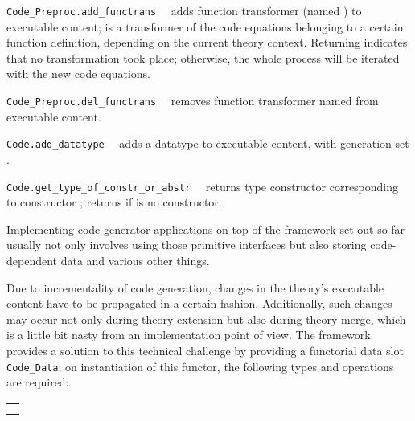\begin{isabellebody}
\begin{isamarkuptext}
\begin{description}
  \item \verb|Code_Preproc.add_functrans|~~ adds
     function transformer  (named ) to executable content;
      is a transformer of the code equations belonging
     to a certain function definition, depending on the
     current theory context.  Returning  indicates that no
     transformation took place;  otherwise, the whole process will be iterated
     with the new code equations.

  \item \verb|Code_Preproc.del_functrans|~~ removes
     function transformer named  from executable content.

  \item \verb|Code.add_datatype|~~ adds
     a datatype to executable content, with generation
     set .

  \item \verb|Code.get_type_of_constr_or_abstr|~~
     returns type constructor corresponding to
     constructor ; returns 
     if  is no constructor.

  \end{description}%
\end{isamarkuptext}%
\isamarkuptrue%
%
\endisatagmlref
{\isafoldmlref}%
%
\isadelimmlref
%
\endisadelimmlref
%
\isamarkuptrue%
%
\begin{isamarkuptext}%
Implementing code generator applications on top
  of the framework set out so far usually not only
  involves using those primitive interfaces
  but also storing code-dependent data and various
  other things.

  Due to incrementality of code generation, changes in the
  theory's executable content have to be propagated in a
  certain fashion.  Additionally, such changes may occur
  not only during theory extension but also during theory
  merge, which is a little bit nasty from an implementation
  point of view.  The framework provides a solution
  to this technical challenge by providing a functorial
  data slot \verb|Code_Data|; on instantiation
  of this functor, the following types and operations
  are required:

  \medskip
  \begin{tabular}{l}
  \isa{type\ T} \\
  \isa{val\ empty{\isacharcolon}\ T} \\
  \end{tabular}


\end{isamarkuptext}
\end{isabellebody}
